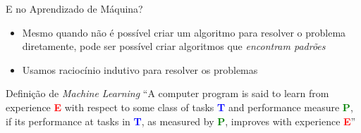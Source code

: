 \documentclass[aspectratio=169,xcolor=dvipsnames]{beamer}
\begin{document}
\begin{frame}{E no Aprendizado de Máquina?}

\begin{itemize}
    \item Mesmo quando não é possível criar um algoritmo para resolver o problema diretamente, pode ser possível criar algoritmos que \alert{\textit{encontram padrões}} 
    \item Usamos raciocínio \alert{indutivo} para resolver os problemas 
    
\end{itemize}

    \begin{block}{Definição de \textit{Machine Learning}}
        ``A computer program is said to learn from experience \textbf{\textcolor{red}{E}} with respect to some class of tasks \textbf{\textcolor{blue}{T}} and performance measure \textbf{\textcolor{green}{P}}, if its performance at tasks in \textbf{\textcolor{blue}{T}}, as measured by \textbf{\textcolor{green}{P}}, improves with experience \textbf{\textcolor{red}{E}}'' 
    \end{block}
    
    
\end{frame}
\end{document}
